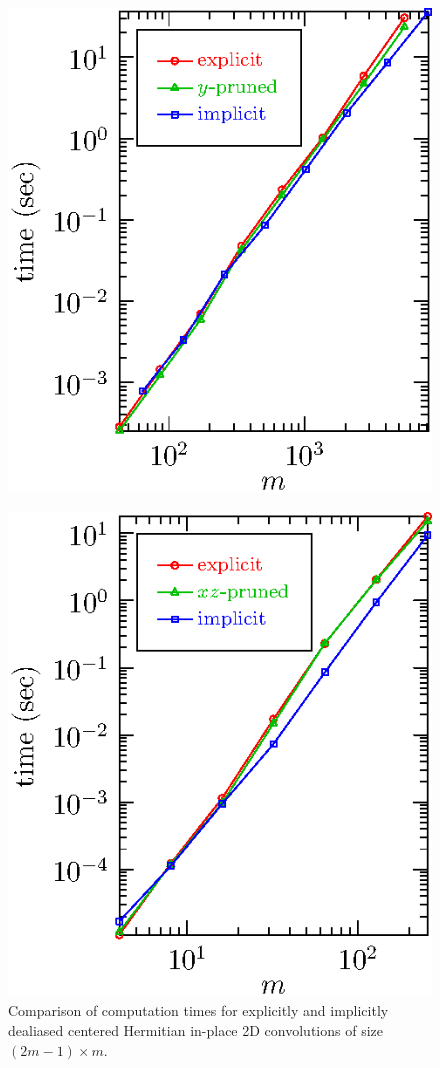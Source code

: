 \documentclass[final]{siamltex}
\begin{document}
\begin{figure}[htbp]
\begin{minipage}{0.48\linewidth}
\begin{center}
\includegraphics{timing2r}
\caption{Comparison of computation times for explicitly and implicitly
dealiased centered Hermitian in-place 2D convolutions of size \hbox{$(2m-1)\times m$}.}
\label{timing2r}
\end{center}
\end{minipage}
\begin{minipage}{0.48\linewidth}
\begin{center}
\includegraphics{timing3c}

\end{center}
\end{minipage}
\end{figure}
\end{document}
